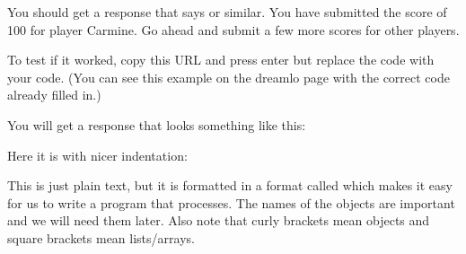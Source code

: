 \documentclass[a4paper,12pt,english]{sphinxmanual}
\begin{document}
\sphinxAtStartPar
{}

\sphinxAtStartPar
You should get a response that says  or similar. You have submitted
the score of 100 for player Carmine. Go ahead and submit a few more
scores for other players.

\sphinxAtStartPar
To test if it worked, copy this URL and press enter but replace the code
with your  code. (You can see this example on the dreamlo page
with the correct code already filled in.)

\begin{sphinxVerbatim}[commandchars=\\\{\}]
\end{sphinxVerbatim}

\sphinxAtStartPar
You will get a response that looks something like this:

\sphinxAtStartPar
{}

\sphinxAtStartPar
Here it is with nicer indentation:

\begin{sphinxVerbatim}[commandchars=\\\{\}]
      \PYG{p}{[}
      \PYG{p}{]}
\end{sphinxVerbatim}

\sphinxAtStartPar
This is just plain text, but it is formatted in a format called 
which makes it easy for us to write a program that processes. The names
of the objects are important and we will need them later. Also note that
curly brackets mean objects and square brackets mean lists/arrays.
\end{document}
